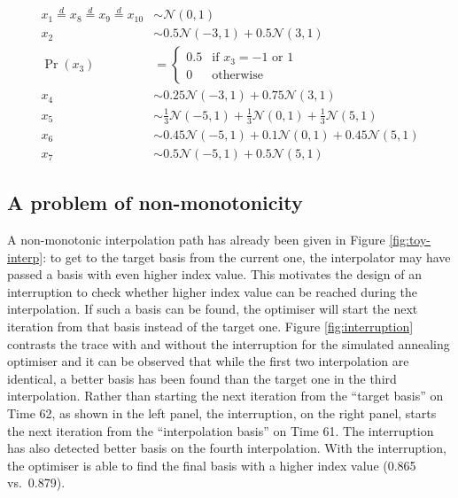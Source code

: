 \begin{align}
x_1 \overset{d}{=} x_8 \overset{d}{=} x_9 \overset{d}{=} x_{10}& \sim \mathcal{N}(0, 1) \label{eq:sim-norm} \\
x_2 &\sim 0.5 \mathcal{N}(-3, 1) + 0.5 \mathcal{N}(3, 1)\label{eq:sim-x2}\\
\Pr(x_3) &= 
\begin{cases}
0.5 & \text{if $x_3 = -1$ or $1$}\\
0 & \text{otherwise}
\end{cases}\label{eq:sim-x3}\\
x_4 &\sim 0.25 \mathcal{N}(-3, 1) + 0.75 \mathcal{N}(3, 1) \label{eq:sim-x4}\\
x_5 &\sim \frac{1}{3} \mathcal{N}(-5, 1) + \frac{1}{3} \mathcal{N}(0, 1) + \frac{1}{3} \mathcal{N}(5, 1)\label{eq:sim-x5}\\
x_6 &\sim 0.45 \mathcal{N}(-5, 1) + 0.1 \mathcal{N}(0, 1) + 0.45 \mathcal{N}(5, 1)\label{eq:sim-x6}\\
x_7 &\sim 0.5 \mathcal{N}(-5, 1) + 0.5 \mathcal{N}(5, 1) 
\label{eq:sim-x7}
\end{align}

\hypertarget{monotonic}{%
\subsection{A problem of non-monotonicity}\label{monotonic}}

A non-monotonic interpolation path has already been given in Figure
\ref{fig:toy-interp}: to get to the target basis from the current one,
the interpolator may have passed a basis with even higher index value.
This motivates the design of an interruption to check whether higher
index value can be reached during the interpolation. If such a basis can
be found, the optimiser will start the next iteration from that basis
instead of the target one. Figure \ref{fig:interruption} contrasts the
trace with and without the interruption for the simulated annealing
optimiser and it can be observed that while the first two interpolation
are identical, a better basis has been found than the target one in the
third interpolation. Rather than starting the next iteration from the
``target basis'' on Time 62, as shown in the left panel, the
interruption, on the right panel, starts the next iteration from the
``interpolation basis'' on Time 61. The interruption has also detected
better basis on the fourth interpolation. With the interruption, the
optimiser is able to find the final basis with a higher index value
(0.865 vs.~0.879).

